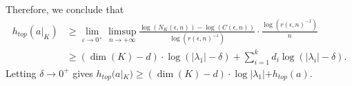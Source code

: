 \documentclass[reqno,12pt]{amsart}
\theoremstyle{definition}
\numberwithin{equation}{section}
\newcommand{\eps}{\varepsilon}
\newcommand {\comm}[1]   {\textcolor{red}{#1}}
\begin{document}
{Therefore, we conclude that \begin{equation*}
    \begin{aligned}
        h_{top}(a|_K)&\geq \lim_{\eps\to 0^+}\limsup_{n\to +\infty}\frac{\log(N_K(\epsilon,n))-\log(C(\epsilon,n))}{\log(r(\epsilon,n)^{-1})}\cdot \frac{\log(r(\epsilon,n)^{-1})}{n}\\
        &\geq (\dim(K)-d)\cdot\log(|\lambda_1|-\delta)+\sum_{i=1}^kd_i\log(|\lambda_i|-\delta).
    \end{aligned}
\end{equation*}
Letting $\delta\to 0^+$ gives $h_{top}(a|_K)\geq (\dim(K)-d)\cdot\log|\lambda_1|+h_{top}(a)$.




}
\end{document}
